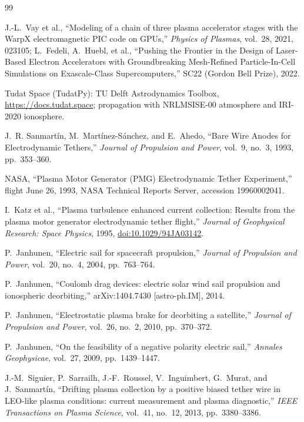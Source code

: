 \documentclass[11pt]{article}
\begin{document}
\begin{thebibliography}{99}

 J.-L.~Vay et al., ``Modeling of a chain of three plasma
  accelerator stages with the WarpX electromagnetic PIC code on GPUs,''
  \emph{Physics of Plasmas}, vol.~28, 2021, 023105; L.~Fedeli, A.~Huebl,
  et al., ``Pushing the Frontier in the Design of Laser-Based Electron
  Accelerators with Groundbreaking Mesh-Refined Particle-In-Cell
  Simulations on Exascale-Class Supercomputers,'' SC22 (Gordon Bell
  Prize), 2022.

 Tudat Space (TudatPy): TU Delft Astrodynamics Toolbox,
  \url{https://docs.tudat.space}; propagation with NRLMSISE-00 atmosphere
  and IRI-2020 ionosphere.

 J.~R. Sanmart\'in, M.~Mart\'inez-S\'anchez, and E.~Ahedo,
  ``Bare Wire Anodes for Electrodynamic Tethers,'' \emph{Journal of
  Propulsion and Power}, vol.~9, no.~3, 1993, pp.~353--360.

 NASA, ``Plasma Motor Generator (PMG) Electrodynamic Tether
  Experiment,'' flight June 26, 1993, NASA Technical Reports Server, accession
  19960002041.

 I.~Katz et al., ``Plasma turbulence enhanced current
  collection: Results from the plasma motor generator electrodynamic tether
  flight,'' \emph{Journal of Geophysical Research: Space Physics}, 1995,
  \href{https://doi.org/10.1029/94JA03142}{doi:10.1029/94JA03142}.

 P.~Janhunen, ``Electric sail for spacecraft propulsion,''
  \emph{Journal of Propulsion and Power}, vol.~20, no.~4, 2004, pp.~763--764.

 P.~Janhunen, ``Coulomb drag devices: electric solar wind sail
  propulsion and ionospheric deorbiting,'' arXiv:1404.7430 [astro-ph.IM],
  2014.

 P.~Janhunen, ``Electrostatic plasma brake for deorbiting a
  satellite,'' \emph{Journal of Propulsion and Power}, vol.~26, no.~2, 2010,
  pp.~370--372.

 P.~Janhunen, ``On the feasibility of a negative polarity
  electric sail,'' \emph{Annales Geophysicae}, vol.~27, 2009, pp.~1439--1447.

 J.-M.~Siguier, P.~Sarrailh, J.-F.~Roussel, V.~Inguimbert,
  G.~Murat, and J.~Sanmart\'in, ``Drifting plasma collection by a positive
  biased tether wire in LEO-like plasma conditions: current measurement and
  plasma diagnostic,'' \emph{IEEE Transactions on Plasma Science}, vol.~41,
  no.~12, 2013, pp.~3380--3386.


\end{thebibliography}
\end{document}
